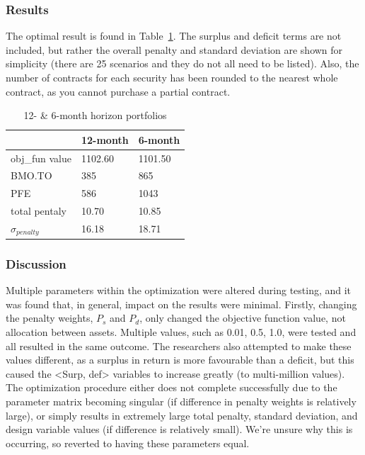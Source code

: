 \documentclass[12pt]{article}
\begin{document}
\subsubsection{Results}
The optimal result is found in Table~\ref{tab:result_pen}.
The surplus and deficit terms are not included, but rather the overall penalty and standard deviation are shown for simplicity (there are 25 scenarios and they do not all need to be listed).
Also, the number of contracts for each security has been rounded to the nearest whole contract, as you cannot purchase a partial contract.

\begin{table}[H]
	\centering
    \begin{tabular}{|l|l|l|}
    \hline
    	~ & \textbf{12-month} & \textbf{6-month} \\ \hline
    	obj\_fun value & 1102.60 & 1101.50 \\ \hline
	BMO.TO & 385 & 865 \\ \hline
	PFE & 586 & 1043 \\ \hline
	total pentaly & 10.70 & 10.85 \\ \hline
	$\sigma_{penalty}$ & 16.18 & 18.71 \\ \hline
    \end{tabular}
    \caption {12- \& 6-month horizon portfolios}
    \label{tab:result_pen}
\end{table}

\subsubsection{Discussion}

Multiple parameters within the optimization were altered during testing, and it was found that, in general, impact on the results were minimal. Firstly, changing the penalty weights, $P_s$ and $P_d$, only changed the objective function value, not allocation between assets. Multiple values, such as 0.01, 0.5, 1.0, were tested and all resulted in the same outcome. The researchers also attempted to make these values different, as a surplus in return is more favourable than a deficit, but this caused the <Surp, def> variables to increase greatly (to multi-million values). The optimization procedure either does not complete successfully due to the parameter matrix becoming singular (if difference in penalty weights is relatively large), or simply results in extremely large total penalty, standard deviation, and design variable values (if difference is relatively small). We’re unsure why this is occurring, so reverted to having these parameters equal.
\end{document}
